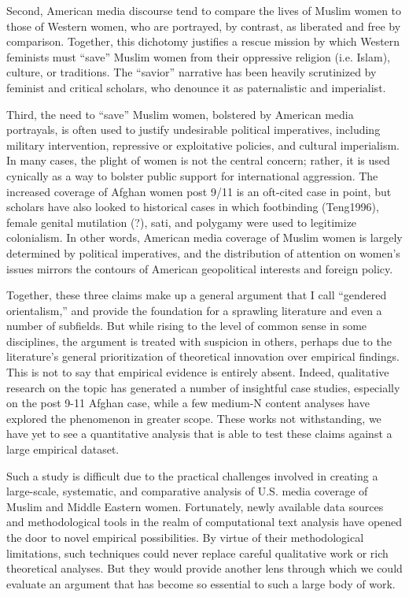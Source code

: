 \documentclass[11pt, oneside]{article}
\begin{document}
Second, American media discourse tend to compare the lives of Muslim women to those of Western women, who are portrayed, by contrast, as liberated and free by comparison. Together, this dichotomy justifies a rescue mission by which Western feminists must ``save'' Muslim women from their oppressive religion (i.e. Islam), culture, or traditions. The ``savior'' narrative has been heavily scrutinized by feminist and critical scholars, who denounce it as paternalistic and imperialist. 

Third, the need to ``save'' Muslim women, bolstered by American media portrayals, is often used to justify undesirable political imperatives, including military intervention, repressive or exploitative policies, and cultural imperialism. In many cases, the plight of women is not the central concern; rather, it is used cynically as a way to bolster public support for international aggression. The increased coverage of Afghan women post 9/11 is an oft-cited case in point, but scholars have also looked to historical cases in which footbinding (Teng1996), female genital mutilation (?), sati, and polygamy were used to legitimize colonialism. In other words, American media coverage of Muslim women is largely determined by political imperatives, and the distribution of attention on women's issues mirrors the contours of American geopolitical interests and foreign policy.

Together, these three claims make up a general argument that I call ``gendered orientalism,'' and provide the foundation for a sprawling literature and even a number of subfields. But while rising to the level of common sense in some disciplines, the argument is treated with suspicion in others, perhaps due to the literature's general prioritization of theoretical innovation over empirical findings. This is not to say that empirical evidence is entirely absent. Indeed, qualitative research on the topic has generated a number of insightful case studies, especially on the post 9-11 Afghan case, while a few medium-N content analyses have explored the phenomenon in greater scope. These works not withstanding, we have yet to see a quantitative analysis that is able to test these claims against a large empirical dataset. 

Such a study is difficult due to the practical challenges involved in creating a large-scale, systematic, and comparative analysis of U.S. media coverage of Muslim and Middle Eastern women. Fortunately, newly available data sources and methodological tools in the realm of computational text analysis have opened the door to novel empirical possibilities. By virtue of their methodological limitations, such techniques could never replace careful qualitative work or rich theoretical analyses. But they would provide another lens through which we could evaluate an argument that has become so essential to such a large body of work.
\end{document}
